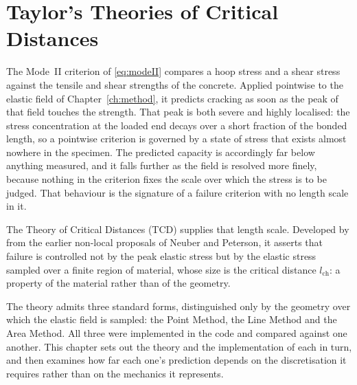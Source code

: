 %

\chapter{Taylor's Theories of Critical Distances}
\label{ch:tcd}

The Mode~II criterion of \eqref{eq:modeII} compares a hoop stress and a shear
stress against the tensile and shear strengths of the concrete. Applied
pointwise to the elastic field of Chapter~\ref{ch:method}, it predicts
cracking as soon as the peak of that field touches the strength. That peak is
both severe and highly localised: the stress concentration at the loaded end
decays over a short fraction of the bonded length, so a pointwise criterion
is governed by a state of stress that exists almost nowhere in the specimen.
The predicted capacity is accordingly far below anything measured, and it
falls further as the field is resolved more finely, because nothing in the
criterion fixes the scale over which the stress is to be judged. That
behaviour is the signature of a failure criterion with no length scale in
it.

The Theory of Critical Distances (TCD) supplies that length scale. Developed
by \textcite{taylorTheoryCriticalDistances2010}
from the earlier non-local proposals of Neuber and Peterson, it asserts that
failure is controlled not by the peak elastic stress but by the elastic
stress sampled over a finite region of material, whose size is the critical
distance $l_{\mathrm{ch}}$: a property of the material rather than of the
geometry.

The theory admits three standard forms, distinguished only by the geometry
over which the elastic field is sampled: the Point Method, the Line Method
and the Area Method. All three were implemented in the code and compared
against one another. This chapter sets out the theory and the implementation
of each in turn, and then examines how far each one's prediction depends on
the discretisation it requires rather than on the mechanics it represents.

